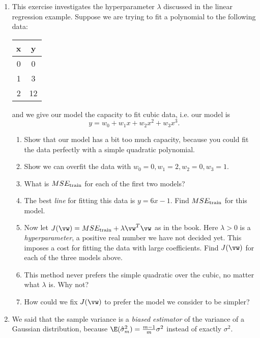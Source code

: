 \documentclass{article}
\newcommand{\strain}{_{\textnormal{train}}}
\begin{document}
\begin{enumerate}
\item \label{ML_ex_hyperparameter}
This exercise investigates the hyperparameter $\lambda$ discussed in the linear regression example. Suppose we are trying to fit a polynomial to the following data:

\begin{tabular}{c|c}
    x & y \\
    \hline
    0 & 0 \\
    1 & 3 \\
    2 & 12
\end{tabular}

and we give our model the capacity to fit cubic data, i.e. our model is
\begin{equation*} y = w_0 + w_1 x + w_2 x^2 + w_3 x^3. \end{equation*}

\begin{enumerate}
    \item Show that our model has a bit too much capacity, because you could fit the data perfectly with a simple quadratic polynomial.
    \item Show we can overfit the data with $w_0 = 0, w_1 = 2, w_2 = 0, w_3 = 1$.
    \item What is $MSE\strain$ for each of the first two models?
    \item The best \emph{line} for fitting this data is $y = 6x - 1$. Find $MSE\strain$ for this model. 
    \item Now let $J(\vw) = MSE\strain + \lambda \vw^T\vw$ as in the book. Here $\lambda > 0$ is a \emph{hyperparameter}, a positive real number we have not decided yet. This imposes a cost for fitting the data with large coefficients. Find $J(\vw)$ for each of the three models above.
    \item This method never prefers the simple quadratic over the cubic, no matter what $\lambda$ is. Why not? 
    \item How could we fix $J(\vw)$ to prefer the model we consider to be simpler?
\end{enumerate}
    
\item \label{ML_ex_bias} 
We said that the sample variance is a \emph{biased estimator} of the variance of a Gaussian distribution, because $\E(\hat{\sigma}_m^2) = \frac{m-1}{m}\sigma^2$ instead of exactly $\sigma^2$.


\end{enumerate}
\end{document}
